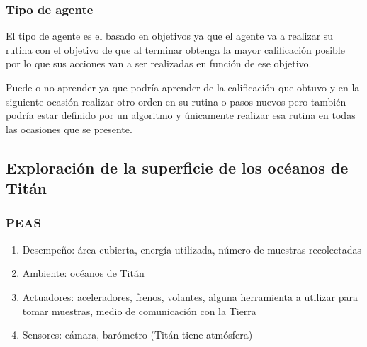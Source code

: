 \documentclass{article}
\begin{document}
            \subsubsection{Tipo de agente}
                El tipo de agente es el basado en objetivos ya que el agente va a realizar su rutina con el objetivo de que al terminar obtenga la mayor calificación posible por lo que sus acciones van a ser realizadas en función de ese objetivo.
                
                Puede o no aprender ya que podría aprender de la calificación que obtuvo y en la siguiente ocasión realizar otro orden en su rutina o pasos nuevos pero también podría estar definido por un algoritmo y únicamente realizar esa rutina en todas las ocasiones que se presente.

        \subsection{Exploración de la superficie de los océanos de Titán}

            \subsubsection{PEAS}
                \begin{enumerate}
                    \item Desempeño: área cubierta, energía utilizada, número de muestras recolectadas
                    \item Ambiente: océanos de Titán
                    \item Actuadores: aceleradores, frenos, volantes, alguna herramienta a utilizar para tomar muestras, medio de comunicación con la Tierra
                    \item Sensores: cámara, barómetro (Titán tiene atmósfera)
            \end{enumerate}
\end{document}
